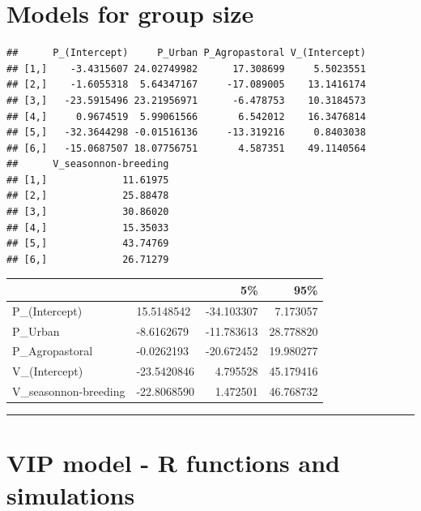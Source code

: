 \documentclass[]{article}
\begin{document}
\section{Models for group size}\label{models-for-group-size-1}

\begin{verbatim}
##      P_(Intercept)     P_Urban P_Agropastoral V_(Intercept)
## [1,]    -3.4315607 24.02749982      17.308699     5.5023551
## [2,]    -1.6055318  5.64347167     -17.089005    13.1416174
## [3,]   -23.5915496 23.21956971      -6.478753    10.3184573
## [4,]     0.9674519  5.99061566       6.542012    16.3476814
## [5,]   -32.3644298 -0.01516136     -13.319216     0.8403038
## [6,]   -15.0687507 18.07756751       4.587351    49.1140564
##      V_seasonnon-breeding
## [1,]             11.61975
## [2,]             25.88478
## [3,]             30.86020
## [4,]             15.35033
## [5,]             43.74769
## [6,]             26.71279
\end{verbatim}

\begin{longtable}[]{@{}llrr@{}}
\toprule
& & 5\% & 95\%\tabularnewline
\midrule
\endhead
P\_(Intercept) & 15.5148542 & -34.103307 & 7.173057\tabularnewline
P\_Urban & -8.6162679 & -11.783613 & 28.778820\tabularnewline
P\_Agropastoral & -0.0262193 & -20.672452 & 19.980277\tabularnewline
V\_(Intercept) & -23.5420846 & 4.795528 & 45.179416\tabularnewline
V\_seasonnon-breeding & -22.8068590 & 1.472501 &
46.768732\tabularnewline
\bottomrule
\end{longtable}

\begin{center}\rule{0.5\linewidth}{\linethickness}\end{center}

\section{VIP model - R functions and
simulations}\label{vip-model---r-functions-and-simulations}
\end{document}
